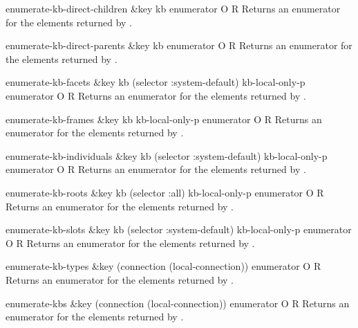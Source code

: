 \begin{okbcop}{enumerate-kb-direct-children}{ \&key kb} { enumerator } { O } { R } {  }
Returns an enumerator for the elements returned by 
.
\end{okbcop}

\begin{okbcop}{enumerate-kb-direct-parents}{ \&key kb} { enumerator } { O } { R } {  }
Returns an enumerator for the elements returned by 
.
\end{okbcop}

\begin{okbcop}{enumerate-kb-facets}{ \&key kb (selector :system-default) kb-local-only-p} { enumerator } { O } { R } {  }
Returns an enumerator for the elements returned by 
.
\end{okbcop}

\begin{okbcop}{enumerate-kb-frames}{ \&key kb kb-local-only-p} { enumerator } { O } { R } {  }
Returns an enumerator for the elements returned by 
.
\end{okbcop}

\begin{okbcop}{enumerate-kb-individuals}{ \&key kb (selector :system-default) kb-local-only-p} { enumerator } { O } { R } {  }
Returns an enumerator for the elements returned by 
.
\end{okbcop}

\begin{okbcop}{enumerate-kb-roots}{ \&key kb (selector :all) kb-local-only-p} { enumerator } { O } { R } {  }
Returns an enumerator for the elements returned by 
.
\end{okbcop}

\begin{okbcop}{enumerate-kb-slots}{ \&key kb (selector :system-default) kb-local-only-p} { enumerator } { O } { R } {  }
Returns an enumerator for the elements returned by 
.
\end{okbcop}

\begin{okbcop}{enumerate-kb-types}{ \&key (connection (local-connection))} { enumerator } { O } { R } {  }
Returns an enumerator for the elements returned by 
.
\end{okbcop}

\begin{okbcop}{enumerate-kbs}{ \&key (connection (local-connection))} { enumerator } { O } { R } {  }
Returns an enumerator for the elements returned by 
.
\end{okbcop}

